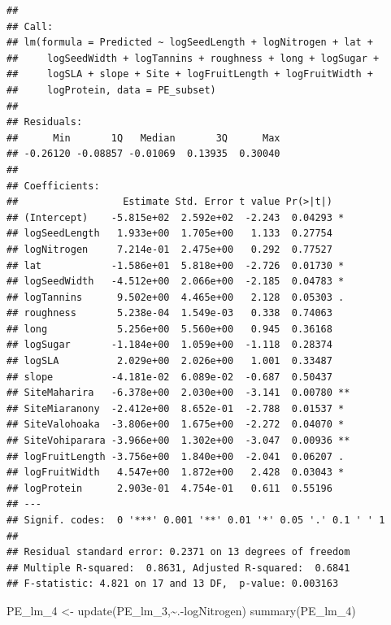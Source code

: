 \documentclass[
  12pt,
]{article}
\newenvironment{Shaded}{\begin{snugshade}}{\end{snugshade}}
\newcommand{\FunctionTok}[1]{\textcolor[rgb]{0.00,0.00,0.00}{#1}}
\newcommand{\NormalTok}[1]{#1}
\newcommand{\OtherTok}[1]{\textcolor[rgb]{0.56,0.35,0.01}{#1}}
\newcommand{\SpecialCharTok}[1]{\textcolor[rgb]{0.00,0.00,0.00}{#1}}
\begin{document}
\begin{verbatim}
## 
## Call:
## lm(formula = Predicted ~ logSeedLength + logNitrogen + lat + 
##     logSeedWidth + logTannins + roughness + long + logSugar + 
##     logSLA + slope + Site + logFruitLength + logFruitWidth + 
##     logProtein, data = PE_subset)
## 
## Residuals:
##      Min       1Q   Median       3Q      Max 
## -0.26120 -0.08857 -0.01069  0.13935  0.30040 
## 
## Coefficients:
##                  Estimate Std. Error t value Pr(>|t|)   
## (Intercept)    -5.815e+02  2.592e+02  -2.243  0.04293 * 
## logSeedLength   1.933e+00  1.705e+00   1.133  0.27754   
## logNitrogen     7.214e-01  2.475e+00   0.292  0.77527   
## lat            -1.586e+01  5.818e+00  -2.726  0.01730 * 
## logSeedWidth   -4.512e+00  2.066e+00  -2.185  0.04783 * 
## logTannins      9.502e+00  4.465e+00   2.128  0.05303 . 
## roughness       5.238e-04  1.549e-03   0.338  0.74063   
## long            5.256e+00  5.560e+00   0.945  0.36168   
## logSugar       -1.184e+00  1.059e+00  -1.118  0.28374   
## logSLA          2.029e+00  2.026e+00   1.001  0.33487   
## slope          -4.181e-02  6.089e-02  -0.687  0.50437   
## SiteMaharira   -6.378e+00  2.030e+00  -3.141  0.00780 **
## SiteMiaranony  -2.412e+00  8.652e-01  -2.788  0.01537 * 
## SiteValohoaka  -3.806e+00  1.675e+00  -2.272  0.04070 * 
## SiteVohiparara -3.966e+00  1.302e+00  -3.047  0.00936 **
## logFruitLength -3.756e+00  1.840e+00  -2.041  0.06207 . 
## logFruitWidth   4.547e+00  1.872e+00   2.428  0.03043 * 
## logProtein      2.903e-01  4.754e-01   0.611  0.55196   
## ---
## Signif. codes:  0 '***' 0.001 '**' 0.01 '*' 0.05 '.' 0.1 ' ' 1
## 
## Residual standard error: 0.2371 on 13 degrees of freedom
## Multiple R-squared:  0.8631, Adjusted R-squared:  0.6841 
## F-statistic: 4.821 on 17 and 13 DF,  p-value: 0.003163
\end{verbatim}

\begin{Shaded}
\begin{Highlighting}[]
\NormalTok{PE\_lm\_4 }\OtherTok{\textless{}{-}} \FunctionTok{update}\NormalTok{(PE\_lm\_3,}\SpecialCharTok{\textasciitilde{}}\NormalTok{.}\SpecialCharTok{{-}}\NormalTok{logNitrogen)}
\FunctionTok{summary}\NormalTok{(PE\_lm\_4)}
\end{Highlighting}
\end{Shaded}
\end{document}
